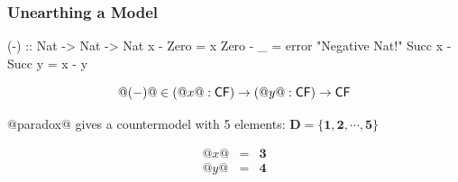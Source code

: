 \documentclass[serif,professionalfont]{beamer}
\begin{document}
\begin{frame}[fragile]
  \frametitle{Unearthing a Model}

    \begin{code}
        (-) :: Nat -> Nat -> Nat
        x      - Zero   = x
        Zero   - _      = error "Negative Nat!"
        Succ x - Succ y = x - y
    \end{code}
    $$@(-)@ \in (@x@ : \mathsf{CF}) \to (@y@ : \mathsf{CF}) \to \mathsf{CF} $$

    @paradox@ gives a countermodel with 5 elements:
    $\mathbf{D} = \{\mathbf{1} , \mathbf{2} , \cdots , \mathbf{5}\}$

\pause

\[\begin{array}{rcl}
@x@ & = & \mathbf{3} \\
@y@ & = & \mathbf{4}
\end{array}\]

\end{frame}
\end{document}
